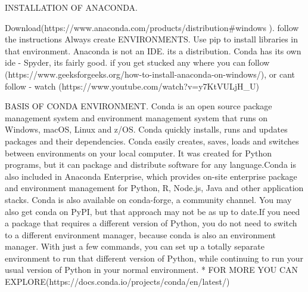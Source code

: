 INSTALLATION OF ANACONDA.

Download(https://www.anaconda.com/products/distribution#windows ). follow the instructions
Always create ENVIRONMENTS. Use pip to install libraries in that environment.
Anaconda is not an IDE. its a distribution. Conda has its own ide - Spyder, its fairly good.
if you get stucked any where you can follow (https://www.geeksforgeeks.org/how-to-install-anaconda-on-windows/), or cant follow - watch (https://www.youtube.com/watch?v=y7KtVULjH_U)

BASIS OF CONDA ENVIRONMENT.
Conda is an open source package management system and environment management system that runs on Windows, macOS, Linux and z/OS. Conda quickly installs, runs and updates packages and their dependencies. Conda easily creates, saves, loads and switches between environments on your local computer. It was created for Python programs, but it can package and distribute software for any language.Conda is also included in Anaconda Enterprise, which provides on-site enterprise package and environment management for Python, R, Node.js, Java and other application stacks. Conda is also available on conda-forge, a community channel. You may also get conda on PyPI, but that approach may not be as up to date.If you need a package that requires a different version of Python, you do not need to switch to a different environment manager, because conda is also an environment manager. With just a few commands, you can set up a totally separate environment to run that different version of Python, while continuing to run your usual version of Python in your normal environment.
 * FOR MORE YOU CAN EXPLORE(https://docs.conda.io/projects/conda/en/latest/) 
